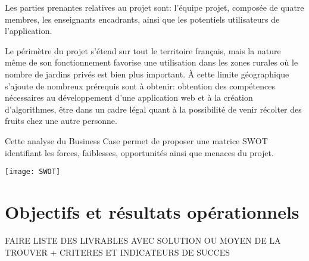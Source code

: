 \documentclass{article}
\begin{document}
\vspace{4mm}

Les parties prenantes relatives au projet sont: l'équipe projet, composée de quatre membres, les enseignants encadrants, ainsi que les potentiels utilisateurs de l'application.

Le périmètre du projet s'étend sur tout le territoire français, mais la nature même de son fonctionnement favorise une utilisation dans les zones rurales où le nombre de jardins privés est bien plus important.
À cette limite géographique s'ajoute de nombreux prérequis sont à obtenir: obtention des compétences nécessaires au développement d'une application web et à la création d'algorithmes, être dans un cadre légal quant à la possibilité de venir récolter des fruits chez une autre personne.

\vspace{4mm}
 
Cette analyse du Business Case permet de proposer une matrice SWOT identifiant les forces, faiblesses, opportunités ainsi que menaces du projet.

\vspace{2mm}             
  
\begin{centering}
\texttt{[image: SWOT]}
\end{centering}

\maketitle
\section{Objectifs et résultats opérationnels}


FAIRE LISTE DES LIVRABLES AVEC SOLUTION OU MOYEN DE LA TROUVER +
CRITERES ET INDICATEURS DE SUCCES
\end{document}
